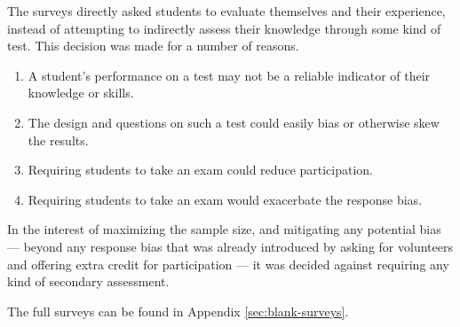     The surveys directly asked students to evaluate themselves and their experience, instead of attempting to indirectly assess their knowledge through some kind of test. 
    This decision was made for a number of reasons. 
    \begin{enumerate}
        \item A student's performance on a test may not be a reliable indicator of their knowledge or skills.
        \item The design and questions on such a test could easily bias or otherwise skew the results. 
        \item Requiring students to take an exam could reduce participation. 
        \item Requiring students to take an exam would exacerbate the response bias.
    \end{enumerate}

    In the interest of maximizing the sample size, and mitigating any potential bias --- 
    beyond any response bias that was already introduced by asking for volunteers and offering extra credit for participation --- 
    it was decided against requiring any kind of secondary assessment. 

    The full surveys can be found in Appendix \ref{sec:blank-surveys}.


